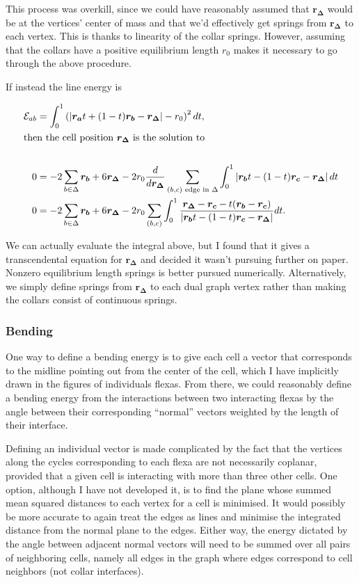 This process was overkill, since we could have reasonably assumed that $\bm{r_\Delta}$ would be at the vertices' center of mass and that we'd effectively get springs from $\bm{r_\Delta}$ to each vertex. This is thanks to linearity of the collar springs. However, assuming that the collars have a positive equilibrium length $r_0$ makes it necessary to go through the above procedure.

If instead the line energy is 

\begin{align*}
    \mathcal{E}_{ab} &= \int_0^1 \left(\left|\bm{r_a}t + (1-t)\bm{r_b} - \bm{r_\Delta}\right| - r_0 \right)^2 dt, \\
    \intertext{then the cell position $\bm{r_\Delta}$ is the solution to} \\
    0 &= -2 \sum_{b\in\Delta} \bm{r_b} + 6 \bm{r_\Delta} - 2r_0 \frac{d}{d\bm{r_\Delta}} \sum_{(b,c) \text{ edge in }\Delta} \int_0^1 \left| \bm{r_b}t - (1-t)\bm{r_c} - \bm{r_\Delta} \right| dt \\
    0 &= -2 \sum_{b\in\Delta} \bm{r_b} + 6 \bm{r_\Delta} - 2r_0 \sum_{(b,c)} \int_0^1 \frac{\bm{r_\Delta} - \bm{r_c} - t(\bm{r_b} - \bm{r_c})}{\left|\bm{r_b}t - (1-t)\bm{r_c} - \bm{r_\Delta} \right|} dt.
\end{align*}

We can actually evaluate the integral above, but I found that it gives a transcendental equation for $\bm{r_\Delta}$ and decided it wasn't pursuing further on paper. Nonzero equilibrium length springs is better pursued numerically. Alternatively, we simply define springs from $\bm{r_\Delta}$ to each dual graph vertex rather than making the collars consist of continuous springs.

\subsubsection{Bending}

One way to define a bending energy is to give each cell a vector that corresponds to the midline pointing out from the center of the cell, which I have implicitly drawn in the figures of individuals flexas. From there, we could reasonably define a bending energy from the interactions between two interacting flexas by the angle between their corresponding ``normal'' vectors weighted by the length of their interface. 

Defining an individual vector is made complicated by the fact that the vertices along the cycles corresponding to each flexa are not necessarily coplanar, provided that a given cell is interacting with more than three other cells. One option, although I have not developed it, is to find the plane whose summed mean squared distances to each vertex for a cell is minimised. It would possibly be more accurate to again treat the edges as lines and minimise the integrated distance from the normal plane to the edges. Either way, the energy dictated by the angle between adjacent normal vectors will need to be summed over all pairs of neighboring cells, namely all edges in the graph where edges correspond to cell neighbors (not collar interfaces).

